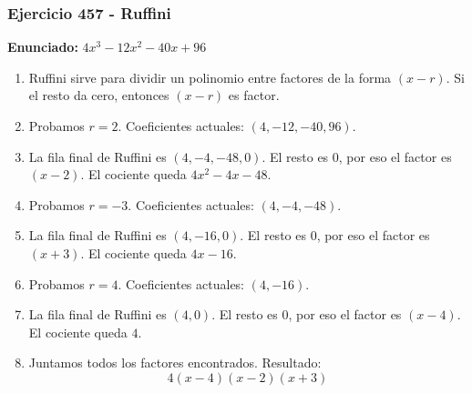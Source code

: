\documentclass[11pt,a4paper]{article}
\begin{document}
\vspace{0.2cm}
\subsubsection*{Ejercicio 457 - Ruffini}
\textbf{Enunciado:} $ 4 x^{3} - 12 x^{2} - 40 x + 96 $\par
\begin{enumerate}[leftmargin=2em]
\item Ruffini sirve para dividir un polinomio entre factores de la forma \((x-r)\). Si el resto da cero, entonces \((x-r)\) es factor.
\item Probamos \(r=2\). Coeficientes actuales: \((4, -12, -40, 96)\).
\item La fila final de Ruffini es \((4, -4, -48, 0)\). El resto es \(0\), por eso el factor es \((x-2)\). El cociente queda \(4 x^{2} - 4 x - 48\).
\item Probamos \(r=-3\). Coeficientes actuales: \((4, -4, -48)\).
\item La fila final de Ruffini es \((4, -16, 0)\). El resto es \(0\), por eso el factor es \((x+3)\). El cociente queda \(4 x - 16\).
\item Probamos \(r=4\). Coeficientes actuales: \((4, -16)\).
\item La fila final de Ruffini es \((4, 0)\). El resto es \(0\), por eso el factor es \((x-4)\). El cociente queda \(4\).
\item Juntamos todos los factores encontrados. Resultado: \[\boxed{4 \left(x - 4\right) \left(x - 2\right) \left(x + 3\right)}\]
\end{enumerate}

\vspace{0.2cm}
\end{document}
